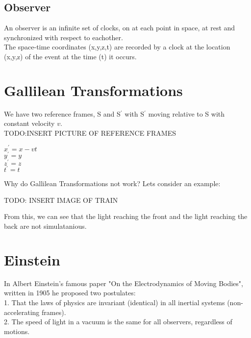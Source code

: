 \documentclass[a4paper]{article}
\begin{document}
\subsection{Observer}
An observer is an infinite set of clocks, on at each point in space, at rest and synchronized with respect to eachother.\\
The space-time coordinates (x,y,z,t) are recorded by a clock at the location (x,y,z) of the event at the time (t) it occurs.

\section{Gallilean Transformations}
We have two reference frames, S and S$^\prime$ with S$^\prime$ moving relative to S with constant velocity $v$.\\

TODO:INSERT PICTURE OF REFERENCE FRAMES  %

\begin{center}

$x^\prime = x-vt$ \\
$y^\prime = y$ \\
$z^\prime = z$\\
$t^\prime = t$\\

\end{center}
Why do Gallilean Transformations not work? Lets consider an example:

\begin{center}
TODO: INSERT IMAGE OF TRAIN
\end{center}

From this, we can see that the light reaching the front and the light reaching the back are not simulatanious.

\section{Einstein}
In Albert Einstein's famous paper "On the Electrodynamics of Moving Bodies", written in 1905 he proposed two postulates:\\
1. That the laws of physics are invariant (identical) in all inertial systems (non-accelerating frames).\\
2. The speed of light in a vacuum is the same for all observers, regardless of motions.\\
\end{document}
